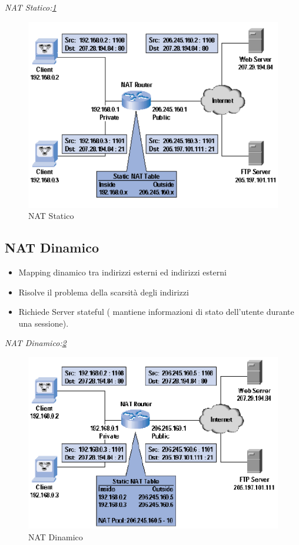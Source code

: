 \documentclass[12pt]{article}
\begin{document}
		\textit{NAT Statico:\ref{fig:2}}
		\begin{figure}[h!]
			\centering
			\includegraphics[scale=0.40]{img/static.PNG}
			\caption{NAT Statico\label{fig:2}}
		\end{figure}
		
		\subsection{NAT Dinamico}
			\begin{itemize}
				\item Mapping dinamico tra indirizzi esterni ed indirizzi esterni
				\item Risolve il problema della scarsità degli indirizzi
				\item Richiede Server stateful ( mantiene informazioni di stato dell'utente durante una sessione).
			\end{itemize}
		\textit{NAT Dinamico:\ref{fig:3}}
		\begin{figure}[h!]
			\centering
			\includegraphics[scale=0.60]{img/dinamic.PNG}
			\caption{NAT Dinamico\label{fig:3}}
		\end{figure}
		
\end{document}

